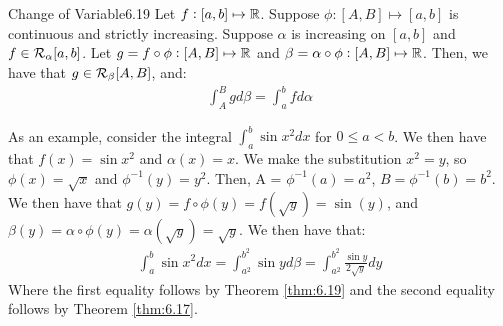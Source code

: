\setcounter{rudin}{18}
\begin{theorem}{Change of Variable}{6.19}
    Let $f: [a, b] \mapsto \mathbb{R}$. Suppose $\phi: [A, B] \mapsto [a, b]$ is continuous and strictly increasing. Suppose $\alpha$ is increasing on $[a, b]$ and $f \in \mathcal{R}_{\alpha}[a, b]$. Let $g = f \circ \phi: [A, B] \mapsto \mathbb{R}$ and $\beta = \alpha \circ \phi: [A, B] \mapsto \mathbb{R}$. Then, we have that $g \in \mathcal{R}_\beta[A, B]$, and:
    \begin{align*}
        \int_A^B g d\beta = \int_a^b fd\alpha
    \end{align*}
\end{theorem}
\noindent As an example, consider the integral $\int_a^b \sin x^2dx$ for $0 \leq a < b$. We then have that $f(x) = \sin x^2$ and $\alpha(x) = x$. We make the substitution $x^2 = y$, so $\phi(x) = \sqrt{x}$ and $\phi^{-1}(y) = y^2$. Then, A = $\phi^{-1}(a) = a^2$, $B = \phi^{-1}(b) = b^2$. We then have that $g(y) = f \circ \phi(y) = f(\sqrt{y}) = \sin(y)$, and $\beta(y) = \alpha \circ \phi(y) = \alpha(\sqrt{y}) = \sqrt{y}$. We then have that:
\begin{align*}
    \int_a^b \sin x^2 dx = \int_{a^2}^{b^2} \sin y d\beta = \int_{a^2}^{b^2} \frac{\sin y}{2\sqrt{y}}dy
\end{align*}
Where the first equality follows by Theorem \ref{thm:6.19} and the second equality follows by Theorem \ref{thm:6.17}.

